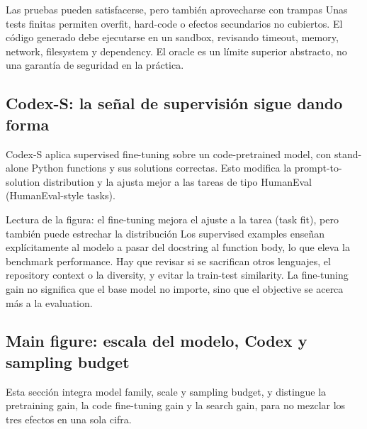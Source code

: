 \begin{warningbox}{Las pruebas pueden satisfacerse, pero también aprovecharse con trampas}
Unas tests finitas permiten overfit, hard-code o efectos secundarios no cubiertos. El código generado debe ejecutarse en un sandbox, revisando timeout, memory, network, filesystem y dependency. El oracle es un límite superior abstracto, no una garantía de seguridad en la práctica.
\end{warningbox}

\subsection{Codex-S: la señal de supervisión sigue dando forma}

Codex-S aplica supervised fine-tuning sobre un code-pretrained model, con stand-alone Python functions y sus solutions correctas. Esto modifica la prompt-to-solution distribution y la ajusta mejor a las tareas de tipo HumanEval (HumanEval-style tasks).


\begin{knowledgebox}{Lectura de la figura: el fine-tuning mejora el ajuste a la tarea (task fit), pero también puede estrechar la distribución}
Los supervised examples enseñan explícitamente al modelo a pasar del docstring al function body, lo que eleva la benchmark performance. Hay que revisar si se sacrifican otros lenguajes, el repository context o la diversity, y evitar la train-test similarity. La fine-tuning gain no significa que el base model no importe, sino que el objective se acerca más a la evaluation.
\end{knowledgebox}

\subsection{Main figure: escala del modelo, Codex y sampling budget}

Esta sección integra model family, scale y sampling budget, y distingue la pretraining gain, la code fine-tuning gain y la search gain, para no mezclar los tres efectos en una sola cifra.


